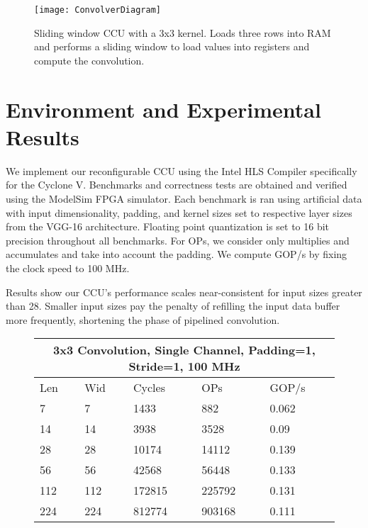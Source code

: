 \begin{figure}
	\texttt{[image: ConvolverDiagram]}
	\caption[Convolver Diagram]%
	{\narrower Sliding window CCU with a 3x3 kernel. Loads three rows into RAM and performs a sliding window to load values into registers and compute the convolution.}
	\label{convolver}
\end{figure}


\section{Environment and Experimental Results}
We implement our reconfigurable CCU using the Intel HLS Compiler specifically for the Cyclone V. Benchmarks and correctness tests are obtained and verified using the ModelSim FPGA simulator. Each benchmark is ran using artificial data with input dimensionality, padding, and kernel sizes set to respective layer sizes from the VGG-16 architecture. Floating point quantization is set to 16 bit precision throughout all benchmarks. For OPs, we consider only multiplies and accumulates and take into account the padding. We compute GOP/s by fixing the clock speed to 100 MHz.

Results show our CCU's performance scales near-consistent for input sizes greater than 28. Smaller input sizes pay the penalty of refilling the input data buffer more frequently, shortening the phase of pipelined convolution. 


\begin{figure}
\begin{tabular}{ |p{3cm}|p{3cm}|p{3cm}|p{3cm}|p{3cm}|  }
	\hline
	\multicolumn{5}{|c|}{3x3 Convolution, Single Channel, Padding=1, Stride=1, 100 MHz} \\
	\hline
	Len & Wid & Cycles & OPs & GOP/s \\
	\hline
	7      & 7    & 1433      & 882      & 0.062\\
	14    & 14   & 3938     & 3528    & 0.09 \\
	28   & 28   & 10174    & 14112    & 0.139\\
	56   & 56   & 42568   & 56448  & 0.133\\
	112  & 112  & 172815  & 225792 & 0.131 \\
	224 & 224 & 812774  & 903168 & 0.111\\
	
	\hline
\end{tabular}
\end{figure}


